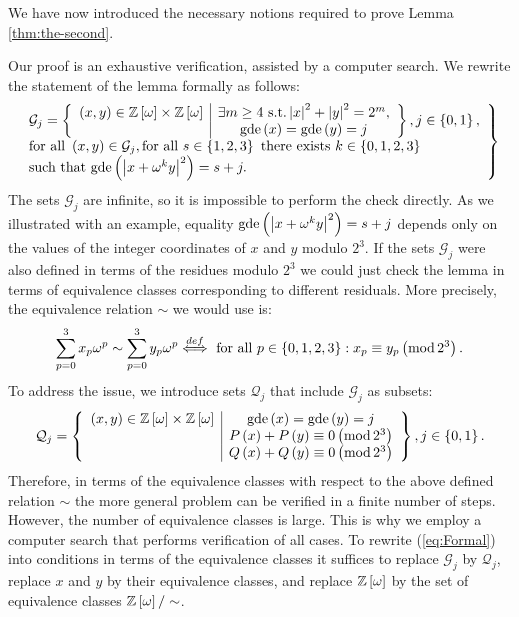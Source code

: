 \documentclass[english,journal]{extarticle}
\makeatletter
\theoremstyle{plain}
\theoremstyle{plain}
\theoremstyle{plain}
\theoremstyle{definition}
\theoremstyle{plain}
\newenvironment{proof}[1][\proofname]{\par
     \normalfont\topsep6\p@\@plus6\p@\relax
     \trivlist
     \itemindent\parindent
     \item[\hskip\labelsep
           \scshape
       #1]\ignorespaces
   }{%
     \endtrivlist\@endpefalse
   }
\providecommand{\proofname}{Proof}
\theoremstyle{plain}
\makeatother
\begin{document}
We have now introduced the necessary notions required to prove Lemma \ref{thm:the-second}.

\begin{proof}
Our proof is an exhaustive verification, assisted by a computer search.  We rewrite the statement of the lemma formally as follows: 
\begin{equation}
\left.\begin{array}{l}
\mathcal{G}_{j}=\left\{ \begin{array}{c|c}
\left(x,y\right)\in\mathbb{Z}\left[\omega\right]\times\mathbb{Z}\left[\omega\right] & \exists m\ge 4 \mbox{ s.t.} \left|x\right|^{2}+\left|y\right|^{2}=2^{m},\\
 & \mathbf{\mathrm{gde}}\left(x\right)=\mathbf{\mathrm{gde}}\left(y\right)=j
\end{array}\right\} ,j\in\left\{ 0,1\right\} ,\\
\mbox{for all }\left(x,y\right)\in\mathcal{G}_{j},\mbox{for all }s\in\left\{
1,2,3\right\} \mbox{ there exists }k\in\left\{ 0,1,2,3\right\} \\
\mbox{such that }\mathbf{\mathrm{gde}}\left(\left|x+\omega^{k}y\right|^{2}\right)=s+j.
\end{array}\right\} \label{eq:Formal}
\end{equation}
The sets $\mathcal{G}_{j}$ are infinite, so it is impossible to perform
the check directly.  As we illustrated with an example, equality
$\mathbf{\mathrm{gde}}\left(\left|x+\omega^{k}y\right|^{2}\right)=s+j$
depends only on the values of the integer coordinates of $x$ and $y$ modulo
$2^{3}$. If the sets $\mathcal{G}_{j}$ were also defined in terms
of the residues modulo $2^{3}$ we could just check the lemma in terms
of equivalence classes corresponding to different residuals.  More
precisely, the equivalence relation $\sim$ we would use is: 
\[
\sum_{p=0}^{3}x_{p}\omega^{p}\sim\sum_{p=0}^{3}y_{p}\omega^{p}\overset{def}{
\Longleftrightarrow}\mbox{ for all }p\in\left\{ 0,1,2,3\right\}: x_{p}\equiv y_{p}\left(\mathrm{mod\,2^{3}}\right).
\]
To address the issue, we introduce sets $\mathcal{Q}_{j}$ that include
$\mathcal{G}_{j}$ as subsets: 
\[
\mathcal{Q}_{j}=\left\{ \begin{array}{c|c}
\left(x,y\right)\in\mathbb{Z}\left[\omega\right]\times\mathbb{Z}\left[\omega\right] & \mathbf{\mathrm{gde}}\left(x\right)=\mathbf{\mathrm{gde}}\left(y\right)=j\\
 & P\left(x\right)+P\left(y\right)\equiv 0\left(\mathrm{mod\,2^{3}}\right)\\
 & Q\left(x\right) + Q\left(y\right) \equiv 0\left(\mathrm{mod\,2^{3}}\right)
\end{array}\right\}, j\in\left\{ 0,1\right\}. 
\]
Therefore, in terms of the equivalence classes with respect to the above defined relation
$\sim$ the more general problem can be verified in a finite number
of steps.  However, the number of equivalence classes is large.  This is why 
we employ a computer search that performs verification of all cases.  To rewrite (\ref{eq:Formal})
into conditions in terms of the equivalence classes it suffices to replace
$\mathcal{G}_{j}$ by $\mathcal{Q}_{j}$, replace $x$ and $y$ by their
equivalence classes, and replace $\mathbb{Z}\left[\omega\right]$ by the set of equivalence classes $\mathbb{Z}\left[\omega\right]/\sim$.


\end{proof}
\end{document}
